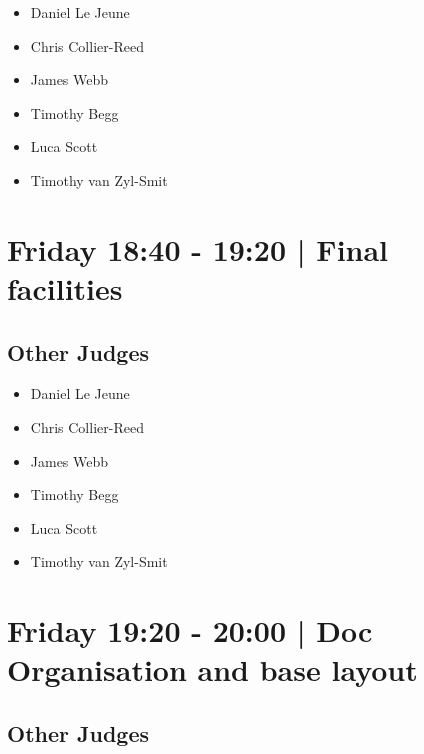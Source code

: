 \documentclass[10pt, A5]{article}
\begin{document}
            \begin{itemize}
                            \item Daniel Le Jeune
                            \item Chris Collier-Reed
                            \item James Webb
                            \item Timothy Begg
                            \item Luca Scott
                            \item Timothy van Zyl-Smit
                        \end{itemize}
        

            \section*{Friday 18:40
        -
        19:20
        |
         Final facilities}
        
                
        \subsection*{Other Judges}
        
            \begin{itemize}
                            \item Daniel Le Jeune
                            \item Chris Collier-Reed
                            \item James Webb
                            \item Timothy Begg
                            \item Luca Scott
                            \item Timothy van Zyl-Smit
                        \end{itemize}
        

            \section*{Friday 19:20
        -
        20:00
        |
         Doc Organisation and base layout}
        
                
        \subsection*{Other Judges}
        
\end{document}
